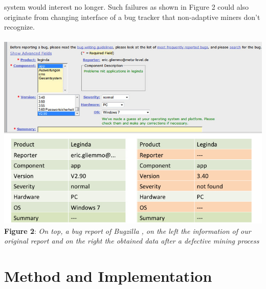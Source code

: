 system would interest no longer. Such failures as shown in Figure 2 could also originate from changing interface of a bug tracker that non-adaptive miners don't recognize. \\ \\ \includegraphics[width=1.0\textwidth]{Folie1.jpg}   \\\textbf{Figure 2}: \textit{On top, a bug report of Bugzilla , on the left the information of our original report and on the right the obtained data after a defective mining process}

\chapter{Method and Implementation}
\label{Method an Implementation}

